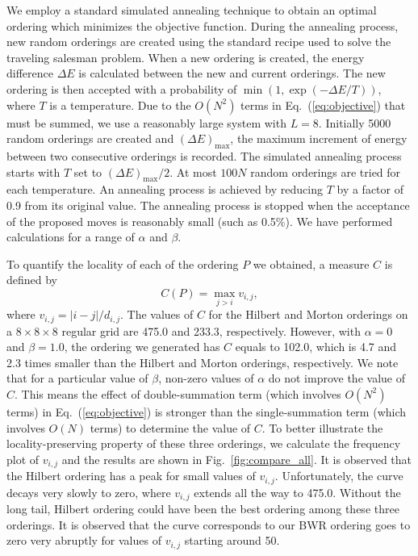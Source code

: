 \documentclass[preprint,showpacs,amssymb,aps]{revtex4}
\begin{document}
We employ a standard simulated annealing technique\cite{Press_86} 
to obtain an optimal ordering which minimizes
the objective function. During the annealing process,
new random orderings are created using the standard recipe used to
solve the traveling salesman problem\cite{Lin_65v44,Press_86}.
When a new ordering is created, 
the energy difference $\Delta E$ is calculated between the new
and current orderings. The new ordering is then 
accepted with a probability of
$\min(1, \exp(-\Delta E/T))$, where $T$ is a temperature. Due to
the $O(N^2)$  terms in Eq.~(\ref{eq:objective}) that must be 
summed, we use a reasonably large system with $L=8$. Initially
5000 random orderings are created and $(\Delta E)_{\mbox{max}}$, the
maximum increment of energy between two consecutive orderings is recorded.
The simulated annealing process starts with
$T$ set to $(\Delta E)_{\mbox{max}}/2$. At most $100N$ random orderings
are tried for each temperature. An annealing process is achieved by
reducing $T$ by a factor of 0.9 from its original value.
The annealing process is stopped
when the acceptance of the proposed moves is 
reasonably small (such as 0.5\%).
We have performed calculations 
for a range of $\alpha$ and $\beta$.

To quantify the locality of each of the ordering $P$ we obtained, 
a measure $C$ is defined by
\begin{equation}
C(P) = \max_{j>i} v_{i,j} ,
\end{equation} 
where $v_{i,j} =  |i-j|/d_{i,j} $.
The values of $C$ for the Hilbert and Morton orderings 
on a $8\times 8 \times 8$ regular grid 
are 475.0 and 233.3, respectively.
However, with $\alpha=0$ and $\beta=1.0$, the ordering we generated 
has $C$ equals to 102.0, which is 4.7 and 2.3 times smaller than the
Hilbert and Morton orderings, respectively.
We note that for a particular value of $\beta$, non-zero values of $\alpha$ 
do not improve the value of $C$. This means the effect of double-summation 
term (which involves $O(N^2)$ terms) in Eq.~(\ref{eq:objective}) 
is stronger than the single-summation term (which involves $O(N)$ terms)
to determine the value of $C$. 
To better illustrate the locality-preserving 
property of these three orderings,
we calculate the frequency
plot of $v_{i,j}$ and the results are 
shown in Fig.~\ref{fig:compare_all}. It is observed that 
the Hilbert ordering 
has a peak for small values of $v_{i,j}$. 
Unfortunately, 
the curve decays very slowly to zero, where $v_{i,j}$ extends all the way
to 475.0.
Without the long tail, Hilbert ordering 
could have been the best ordering among these
three orderings.
It is observed that the curve corresponds to our BWR ordering goes 
to zero very abruptly for 
values of $v_{i,j}$ starting around 50.
\end{document}
